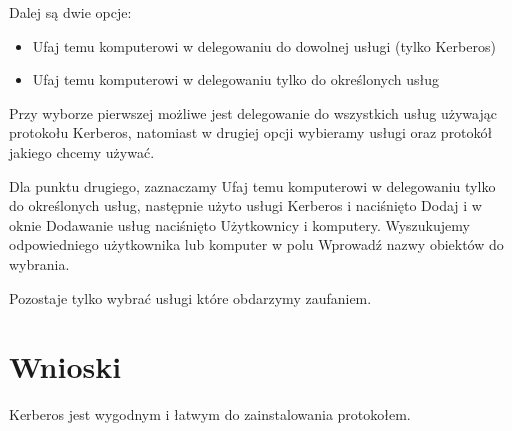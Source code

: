 \documentclass[a4paper,twoside,12pt]{mgr}
\begin{document}
Dalej są dwie opcje:
\begin{itemize}
\item Ufaj temu komputerowi w delegowaniu do dowolnej usługi (tylko Kerberos)
\item Ufaj temu komputerowi w delegowaniu tylko do określonych usług
\end{itemize}
Przy wyborze pierwszej możliwe jest delegowanie do wszystkich usług używając protokołu Kerberos,
natomiast w drugiej opcji wybieramy usługi oraz protokół jakiego chcemy używać.

Dla punktu drugiego, zaznaczamy Ufaj temu komputerowi w delegowaniu tylko do określonych usług,
następnie użyto usługi Kerberos i naciśnięto Dodaj i w oknie Dodawanie usług naciśnięto Użytkownicy i
komputery. Wyszukujemy odpowiedniego użytkownika lub komputer w polu Wprowadź nazwy obiektów do
wybrania.

Pozostaje tylko wybrać usługi które obdarzymy zaufaniem.
\chapter{Wnioski}
Kerberos jest wygodnym i łatwym do zainstalowania protokołem.
\end{document}
